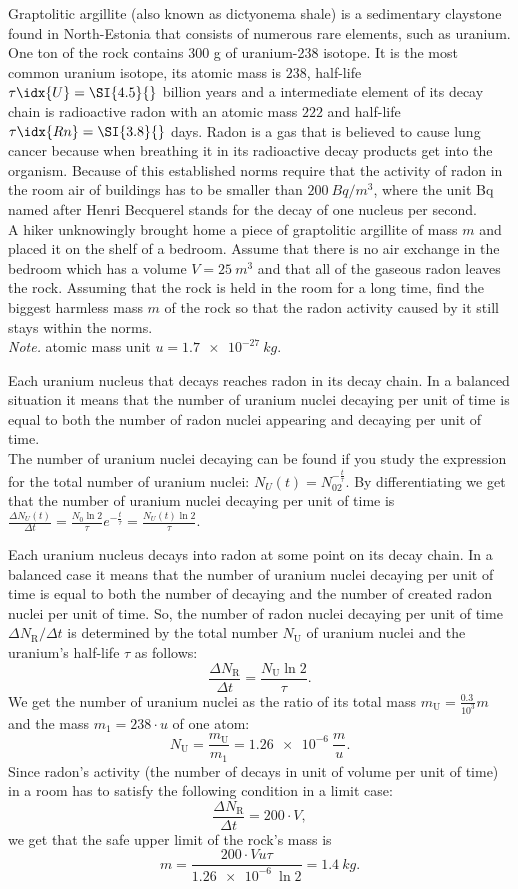 Graptolitic argillite (also known as dictyonema shale) is a sedimentary claystone found in North-Estonia that consists of numerous rare elements, such as uranium. One ton of the rock contains 300 g of uranium-238 isotope. It is the most common uranium isotope, its atomic mass is $238$, half-life $\tau\idx{U}=\SI{4.5}{}$ billion years and a intermediate element of its decay chain is radioactive radon with an atomic mass $222$ and half-life $\tau\idx{Rn}=\SI{3.8}{}$ days. Radon is a gas that is believed to cause lung cancer because when breathing it in its radioactive decay products get into the organism. Because of this established norms require that the activity of radon in the room air of buildings has to be smaller than $\SI{200}{Bq/m^3}$, where the unit Bq named after Henri Becquerel stands for the decay of one nucleus per second.\\
A hiker unknowingly brought home a piece of graptolitic argillite of mass $m$ and placed it on the shelf of a bedroom. Assume that there is no air exchange in the bedroom which has a volume $V=\SI{25}{m^3}$ and that all of the gaseous radon leaves the rock. Assuming that the rock is held in the room for a long time, find the biggest harmless mass $m$ of the rock so that the radon activity caused by it still stays within the norms.\\
\emph{Note.} atomic mass unit $u=\SI{1.7e-27}{kg}$.

\hinteng
Each uranium nucleus that decays reaches radon in its decay chain. In a balanced situation it means that the number of uranium nuclei decaying per unit of time is equal to both the number of radon nuclei appearing and decaying per unit of time.\\
The number of uranium nuclei decaying can be found if you study the expression for the total number of uranium nuclei: $N_U(t) = N_02^{-\frac{t}{\tau}}$. By differentiating we get that the number of uranium nuclei decaying per unit of time is $\frac{\Delta N_U(t)}{\Delta t} = \frac{N_0\ln 2}{\tau}e^{-\frac{t}{\tau}} = \frac{N_U(t)\ln 2}{\tau}$.

\solueng
Each uranium nucleus decays into radon at some point on its decay chain. In a balanced case it means that the number of uranium nuclei decaying per unit of time is equal to both the number of decaying and the number of created radon nuclei per unit of time. So, the number of radon nuclei decaying per unit of time $\Delta N_\text{R} / \Delta t$ is determined by the total number $N_\text{U}$ of uranium nuclei and the uranium's half-life $\tau$ as follows:
\[
\frac{\Delta N_\text{R}}{\Delta t} = \frac{N_\text{U} \ln 2}{\tau}.
\] 
We get the number of uranium nuclei as the ratio of its total mass $m_\text{U} = \frac{\SI{0.3}{}}{10^3} m$ and the mass $m_1=238 \cdot u$ of one atom:
\[
N_\text{U}=\frac{m_\text{U}}{m_1}=\SI{1.26e-6}{} \frac{m}{u}.
\] 
Since radon's activity (the number of decays in unit of volume per unit of time) in a room has to satisfy the following condition in a limit case:
\[
\frac{\Delta N_\text{R}}{\Delta t} = 200\cdot V,
\] 
we get that the safe upper limit of the rock's mass is
\[
m = \frac{200\cdot V u \tau}{\SI{1.26e-6}{}\ln 2}=\SI{1.4}{kg}.
\]
\probend